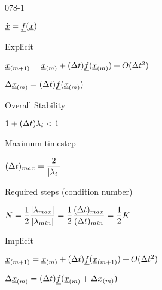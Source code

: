 \begin{mitframe}{078-1}
        
 \begin{listone}
	\item $\uline{\dot{\disp}}=\uline{\fug}(\uline{\disp})$
    
    \item Explicit    
    \begin{listtwo}
    	\item $\uline{\disp}_{(\mass+1)}=\uline{\disp}_{(\mass)}+(\iipf\timet)\uline{\fug}(\uline{\disp}_{(\mass)})+O(\iipf\timet^2)$
        
        \item $\iipf\uline{\disp}_{(\mass)}=(\iipf\timet)\uline{\fug}(\uline{\disp}_{(\mass)})$
        
        \item Overall Stability
        \begin{listthree}
			\item $1+(\iipf\timet)\wavel_{\state}<1$
		\end{listthree}
            
        \item Maximum timestep
		\begin{listthree}
			\item $(\iipf\timet)_{max}=\dfrac{2}{|\wavel_{\state}|}$
		\end{listthree}       
                
        \item Required steps (condition number)
		\begin{listthree}
        	\item $\nummoles=\dfrac{1}{2}\dfrac{|\wavel_{max}|}{|\wavel_{min}|}=\dfrac{1}{2}\dfrac{(\iipf\timet)_{max}}{(\iipf\timet)_{min}}=\dfrac{1}{2}\dilfac$           
		\end{listthree}
	\end{listtwo}
    
    \item Implicit
	\begin{listtwo}
       	\item  $\uline{\disp}_{(\mass+1)}=\uline{\disp}_{(\mass)}+(\iipf\timet)\uline{\fug}(\uline{\disp}_{(\mass+1)})+O(\iipf\timet^2)$
		
        \item $\iipf\uline{\disp}_{(\mass)}=(\iipf\timet)\uline{\fug}(\uline{\disp}_{(\mass)}+\iipf\disp_{(\mass)})$
        

\end{listtwo}
\end{listone}
\end{mitframe}
